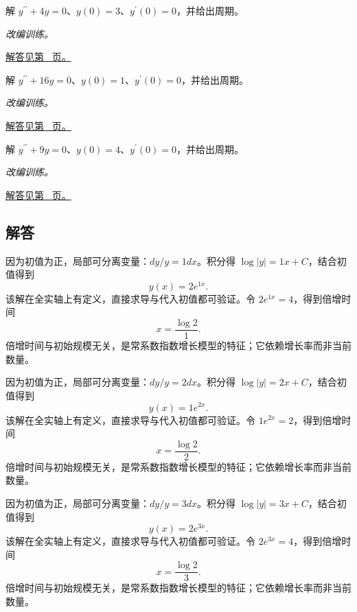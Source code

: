 \documentclass[UTF8,12pt,a4paper,fontset=fandol]{ctexart}
\begin{document}
\begin{example}[简谐振动初值问题]\label{ex:c22q22}
解 $y^{\prime\prime}+4y=0$、$y(0)=3$、$y^{\prime}(0)=0$，并给出周期。
\par\textit{改编训练。}\par\hyperref[ans:c22q22]{解答见第~\pageref{ans:c22q22} 页。}
\end{example}
\begin{example}[简谐振动初值问题]\label{ex:c22q23}
解 $y^{\prime\prime}+16y=0$、$y(0)=1$、$y^{\prime}(0)=0$，并给出周期。
\par\textit{改编训练。}\par\hyperref[ans:c22q23]{解答见第~\pageref{ans:c22q23} 页。}
\end{example}
\begin{example}[简谐振动初值问题]\label{ex:c22q24}
解 $y^{\prime\prime}+9y=0$、$y(0)=4$、$y^{\prime}(0)=0$，并给出周期。
\par\textit{改编训练。}\par\hyperref[ans:c22q24]{解答见第~\pageref{ans:c22q24} 页。}
\end{example}
\subsection{解答}
\begin{solve}\label{ans:c22q1}
因为初值为正，局部可分离变量：$dy/y=1dx$。积分得 $\log|y|=1x+C$，结合初值得到
\[
y(x)=2e^{1x}.
\]
该解在全实轴上有定义，直接求导与代入初值都可验证。令 $2e^{1x}=4$，得到倍增时间
\[
x=\frac{\log2}{1}.
\]
倍增时间与初始规模无关，是常系数指数增长模型的特征；它依赖增长率而非当前数量。
\end{solve}

\begin{solve}\label{ans:c22q2}
因为初值为正，局部可分离变量：$dy/y=2dx$。积分得 $\log|y|=2x+C$，结合初值得到
\[
y(x)=1e^{2x}.
\]
该解在全实轴上有定义，直接求导与代入初值都可验证。令 $1e^{2x}=2$，得到倍增时间
\[
x=\frac{\log2}{2}.
\]
倍增时间与初始规模无关，是常系数指数增长模型的特征；它依赖增长率而非当前数量。
\end{solve}

\begin{solve}\label{ans:c22q3}
因为初值为正，局部可分离变量：$dy/y=3dx$。积分得 $\log|y|=3x+C$，结合初值得到
\[
y(x)=2e^{3x}.
\]
该解在全实轴上有定义，直接求导与代入初值都可验证。令 $2e^{3x}=4$，得到倍增时间
\[
x=\frac{\log2}{3}.
\]
倍增时间与初始规模无关，是常系数指数增长模型的特征；它依赖增长率而非当前数量。
\end{solve}
\end{document}
